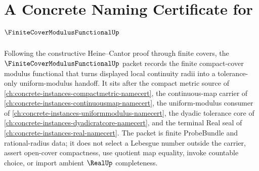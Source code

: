 \chapter{A Concrete Naming Certificate for $\FiniteCoverModulusFunctionalUp$}
\label{ch:concrete-instances-finite-cover-modulus-functional-namecert}

Following the constructive Heine--Cantor proof through finite covers, the $\FiniteCoverModulusFunctionalUp$ packet records the finite compact-cover modulus functional that turns displayed local continuity radii into a tolerance-only uniform-modulus handoff. It sits after the compact metric source of \autoref{ch:concrete-instances-compactmetric-namecert}, the continuous-map carrier of \autoref{ch:concrete-instances-continuousmap-namecert}, the uniform-modulus consumer of \autoref{ch:concrete-instances-uniformmodulus-namecert}, the dyadic tolerance core of \autoref{ch:concrete-instances-dyadicratcore-namecert}, and the terminal Real seal of \autoref{ch:concrete-instances-real-namecert}. The packet is finite ProbeBundle and rational-radius data; it does not select a Lebesgue number outside the carrier, assert open-cover compactness, use quotient map equality, invoke countable choice, or import ambient $\RealUp$ completeness.

